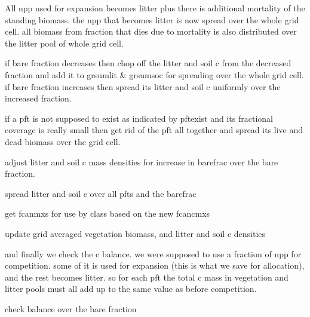 All npp used for expansion becomes litter plus there is additional mortality of the standing biomass. the npp that becomes litter is now spread over the whole grid cell. all biomass from fraction that dies due to mortality is also distributed over the litter pool of whole grid cell.

if bare fraction decreases then chop off the litter and soil c from the decreased fraction and add it to grsumlit \& grsumsoc for spreading over the whole grid cell. if bare fraction increases then spread its litter and soil c uniformly over the increased fraction.

if a pft is not supposed to exist as indicated by pftexist and its fractional coverage is really small then get rid of the pft all together and spread its live and dead biomass over the grid cell.

adjust litter and soil c mass densities for increase in barefrac over the bare fraction.

spread litter and soil c over all pfts and the barefrac

get fcanmxs for use by class based on the new fcancmxs

update grid averaged vegetation biomass, and litter and soil c densities

and finally we check the c balance. we were supposed to use a fraction of npp for competition. some of it is used for expansion (this is what we save for allocation), and the rest becomes litter. so for each pft the total c mass in vegetation and litter pools must all add up to the same value as before competition.

check balance over the bare fraction 